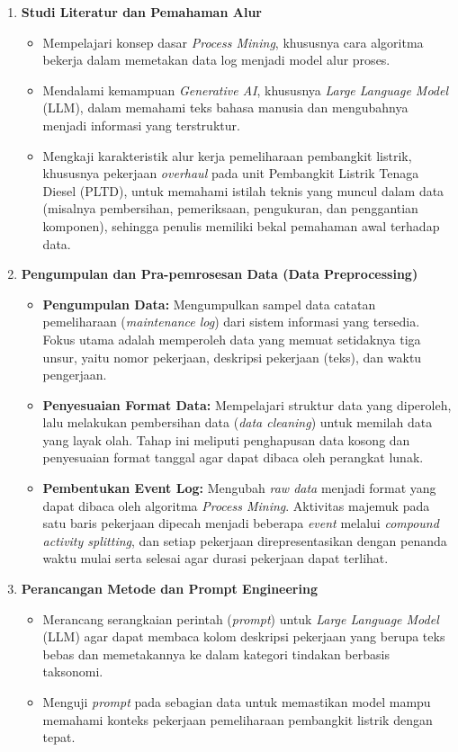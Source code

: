 \begin{enumerate}
  \item \textbf{Studi Literatur dan Pemahaman Alur}
  \begin{itemize}
    \item Mempelajari konsep dasar \textit{Process Mining}, khususnya cara algoritma bekerja dalam memetakan data log menjadi model alur proses.
    \item Mendalami kemampuan \textit{Generative AI}, khususnya \textit{Large Language Model} (LLM), dalam memahami teks bahasa manusia dan mengubahnya menjadi informasi yang terstruktur.
    \item Mengkaji karakteristik alur kerja pemeliharaan pembangkit listrik, khususnya pekerjaan \textit{overhaul} pada unit Pembangkit Listrik Tenaga Diesel (PLTD), untuk memahami istilah teknis yang muncul dalam data (misalnya pembersihan, pemeriksaan, pengukuran, dan penggantian komponen), sehingga penulis memiliki bekal pemahaman awal terhadap data.
  \end{itemize}

  \item \textbf{Pengumpulan dan Pra-pemrosesan Data (Data Preprocessing)}
  \begin{itemize}
    \item \textbf{Pengumpulan Data:} Mengumpulkan sampel data catatan pemeliharaan (\textit{maintenance log}) dari sistem informasi yang tersedia. Fokus utama adalah memperoleh data yang memuat setidaknya tiga unsur, yaitu nomor pekerjaan, deskripsi pekerjaan (teks), dan waktu pengerjaan.
    \item \textbf{Penyesuaian Format Data:} Mempelajari struktur data yang diperoleh, lalu melakukan pembersihan data (\textit{data cleaning}) untuk memilah data yang layak olah. Tahap ini meliputi penghapusan data kosong dan penyesuaian format tanggal agar dapat dibaca oleh perangkat lunak.
    \item \textbf{Pembentukan Event Log:} Mengubah \textit{raw data} menjadi format yang dapat dibaca oleh algoritma \textit{Process Mining}. Aktivitas majemuk pada satu baris pekerjaan dipecah menjadi beberapa \textit{event} melalui \textit{compound activity splitting}, dan setiap pekerjaan direpresentasikan dengan penanda waktu mulai serta selesai agar durasi pekerjaan dapat terlihat.
  \end{itemize}

  \item \textbf{Perancangan Metode dan Prompt Engineering}
  \begin{itemize}
    \item Merancang serangkaian perintah (\textit{prompt}) untuk \textit{Large Language Model} (LLM) agar dapat membaca kolom deskripsi pekerjaan yang berupa teks bebas dan memetakannya ke dalam kategori tindakan berbasis taksonomi.
    \item Menguji \textit{prompt} pada sebagian data untuk memastikan model mampu memahami konteks pekerjaan pemeliharaan pembangkit listrik dengan tepat.
  \end{itemize}


\end{enumerate}
